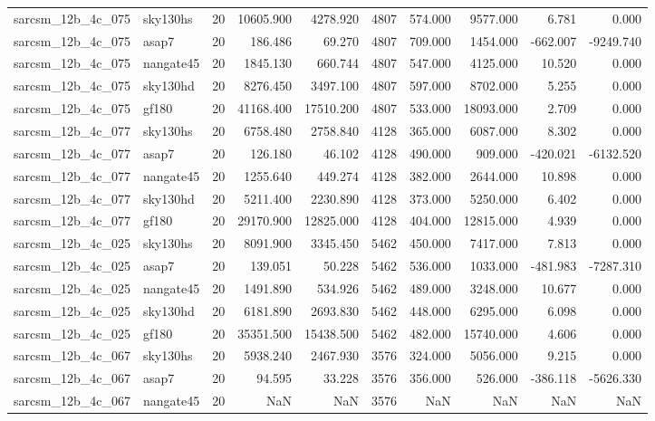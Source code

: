 \documentclass{article}
\begin{document}
\begin{longtable}{llrrrrrrrr}
sarcsm\_12b\_4c\_075 & sky130hs & 20 & 10605.900 & 4278.920 & 4807 & 574.000 & 9577.000 & 6.781 & 0.000 \\
sarcsm\_12b\_4c\_075 & asap7 & 20 & 186.486 & 69.270 & 4807 & 709.000 & 1454.000 & -662.007 & -9249.740 \\
sarcsm\_12b\_4c\_075 & nangate45 & 20 & 1845.130 & 660.744 & 4807 & 547.000 & 4125.000 & 10.520 & 0.000 \\
sarcsm\_12b\_4c\_075 & sky130hd & 20 & 8276.450 & 3497.100 & 4807 & 597.000 & 8702.000 & 5.255 & 0.000 \\
sarcsm\_12b\_4c\_075 & gf180 & 20 & 41168.400 & 17510.200 & 4807 & 533.000 & 18093.000 & 2.709 & 0.000 \\
sarcsm\_12b\_4c\_077 & sky130hs & 20 & 6758.480 & 2758.840 & 4128 & 365.000 & 6087.000 & 8.302 & 0.000 \\
sarcsm\_12b\_4c\_077 & asap7 & 20 & 126.180 & 46.102 & 4128 & 490.000 & 909.000 & -420.021 & -6132.520 \\
sarcsm\_12b\_4c\_077 & nangate45 & 20 & 1255.640 & 449.274 & 4128 & 382.000 & 2644.000 & 10.898 & 0.000 \\
sarcsm\_12b\_4c\_077 & sky130hd & 20 & 5211.400 & 2230.890 & 4128 & 373.000 & 5250.000 & 6.402 & 0.000 \\
sarcsm\_12b\_4c\_077 & gf180 & 20 & 29170.900 & 12825.000 & 4128 & 404.000 & 12815.000 & 4.939 & 0.000 \\
sarcsm\_12b\_4c\_025 & sky130hs & 20 & 8091.900 & 3345.450 & 5462 & 450.000 & 7417.000 & 7.813 & 0.000 \\
sarcsm\_12b\_4c\_025 & asap7 & 20 & 139.051 & 50.228 & 5462 & 536.000 & 1033.000 & -481.983 & -7287.310 \\
sarcsm\_12b\_4c\_025 & nangate45 & 20 & 1491.890 & 534.926 & 5462 & 489.000 & 3248.000 & 10.677 & 0.000 \\
sarcsm\_12b\_4c\_025 & sky130hd & 20 & 6181.890 & 2693.830 & 5462 & 448.000 & 6295.000 & 6.098 & 0.000 \\
sarcsm\_12b\_4c\_025 & gf180 & 20 & 35351.500 & 15438.500 & 5462 & 482.000 & 15740.000 & 4.606 & 0.000 \\
sarcsm\_12b\_4c\_067 & sky130hs & 20 & 5938.240 & 2467.930 & 3576 & 324.000 & 5056.000 & 9.215 & 0.000 \\
sarcsm\_12b\_4c\_067 & asap7 & 20 & 94.595 & 33.228 & 3576 & 356.000 & 526.000 & -386.118 & -5626.330 \\
sarcsm\_12b\_4c\_067 & nangate45 & 20 & NaN & NaN & 3576 & NaN & NaN & NaN & NaN \\

\end{longtable}
\end{document}

